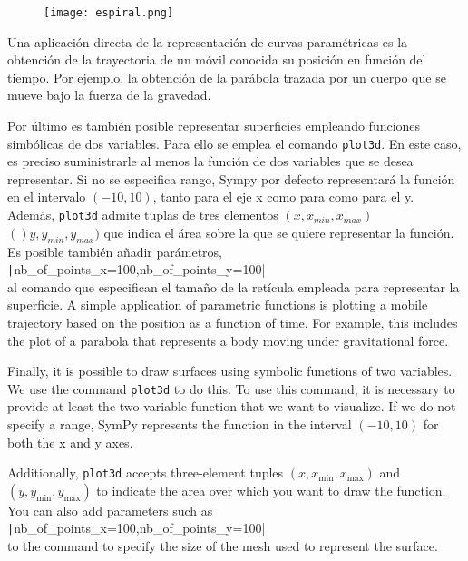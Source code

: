 \begin{figure}
	\centering
	\texttt{[image: espiral.png]}
		\label{fig:simpar}
		
\end{figure}
 

\begin{paracol}{2} 
Una aplicación directa de la representación de curvas paramétricas es la obtención de la trayectoria de un móvil conocida su posición en función del tiempo. Por ejemplo, la obtención de la parábola trazada por un cuerpo que se mueve bajo la fuerza de la gravedad. 


Por último es también posible representar superficies empleando funciones simbólicas de dos variables. Para ello se emplea el comando \texttt{plot3d}. En este caso, es preciso suministrarle al menos la función de dos variables que se desea representar. Si no se especifica rango, Sympy por defecto representará la función en el intervalo $(-10,10)$, tanto para el eje x como para  como para el y. Además, \texttt{plot3d} admite tuplas de tres elementos $(x, x_{min}, x_{max})$  $()y, y_{min},y_{max})$ que indica el área sobre la que se quiere representar la función. Es posible también añadir parámetros,\\ \texttt|nb_of_points_x=100,nb_of_points_y=100|\\  al comando que especifican el tamaño de la retícula empleada para representar la superficie. 
\switchcolumn
A simple application of parametric functions is plotting a mobile trajectory based on the position as a function of time. For example, this includes the plot of a parabola that represents a body moving under gravitational force.

Finally, it is possible to draw surfaces using symbolic functions of two variables. We use the command \texttt{plot3d} to do this. To use this command, it is necessary to provide at least the two-variable function that we want to visualize. If we do not specify a range, SymPy represents the function in the interval \((-10, 10)\) for both the x and y axes. 

Additionally, \texttt{plot3d} accepts three-element tuples \((x, x_{\text{min}}, x_{\text{max}})\) and \((y, y_{\text{min}}, y_{\text{max}})\) to indicate the area over which you want to draw the function. You can also add parameters such as\\ \texttt|nb_of_points_x=100,nb_of_points_y=100|\\ to the command to specify the size of the mesh used to represent the surface.
\end{paracol}  
